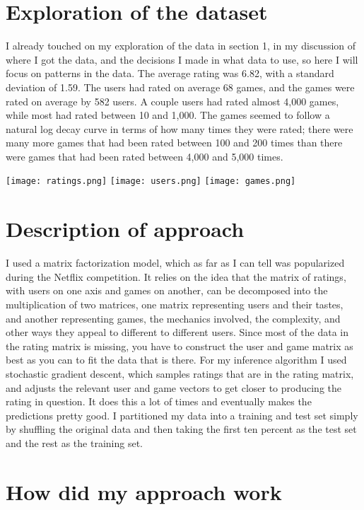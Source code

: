 \documentclass[11pt]{article}
\begin{document}
\section{Exploration of the dataset}
I already touched on my exploration of the data in section 1, in my discussion of where I got the data, and the decisions I made in what data to use, so here I will focus on patterns in the data. The average rating was 6.82, with a standard deviation of 1.59. The users had rated on average 68 games, and the games were rated on average by 582 users. A couple users had rated almost 4,000 games, while most had rated between 10 and 1,000. The games seemed to follow a natural log decay curve in terms of how many times they were rated; there were many more games that had been rated between 100 and 200 times than there were games that had been rated between 4,000 and 5,000 times.
\begin{center}
\texttt{[image: ratings.png]}
\texttt{[image: users.png]}
\texttt{[image: games.png]}
\end{center}

\section{Description of approach}
I used a matrix factorization model, which as far as I can tell was popularized during the Netflix competition. It relies on the idea that the matrix of ratings, with users on one axis and games on another, can be decomposed into the multiplication of two matrices, one matrix representing users and their tastes, and another representing games, the mechanics involved, the complexity, and other ways they appeal to different to different users. Since most of the data in the rating matrix is missing, you have to construct the user and game matrix as best as you can to fit the data that is there. For my inference algorithm I used stochastic gradient descent, which samples ratings that are in the rating matrix, and adjusts the relevant user and game vectors to get closer to producing the rating in question. It does this a lot of times and eventually makes the predictions pretty good. I partitioned my data into a training and test set simply by shuffling the original data and then taking the first ten percent as the test set and the rest as the training set.

\section{How did my approach work}
\end{document}
